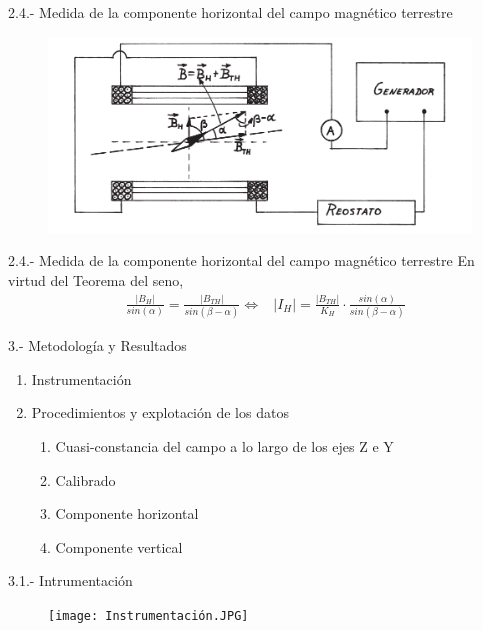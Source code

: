 \documentclass{beamer}
\newcommand{\ifff}{\Leftrightarrow}
\providecommand{\abs}[1]{\left|#1\right|}
\begin{document}
\begin{frame}{2.4.- Medida de la componente horizontal del campo magnético terrestre}
    \begin{figure}
        \centering
        \includegraphics[scale=0.35]{imagen_2023-04-17_035041851.png}
        \label{fig:my_label}
    \end{figure}
\cite{Boix}
\end{frame}
\begin{frame}{2.4.- Medida de la componente horizontal del campo magnético terrestre}
En virtud del Teorema del seno, \pause
    \begin{align*}
        & \frac{\abs{B_{H}}}{sin(\alpha)} = \frac{\abs{B_{TH}}}{sin(\beta-\alpha)} \nonumber \ifff
        & \abs{I_{H}} = \frac{\abs{B_{TH}}}{K_{H}} \cdot \frac{sin(\alpha)}{sin(\beta - \alpha)}
    \end{align*}
\end{frame}
\begin{frame}{3.- Metodología y Resultados}
\begin{enumerate}
\item Instrumentación
\item Procedimientos y explotación de los datos
\begin{enumerate}[label*=\arabic*.]
    \item Cuasi-constancia del campo a lo largo de los ejes Z e Y
    \item Calibrado
    \item Componente horizontal
    \item Componente vertical
    \end{enumerate}
\end{enumerate}
\end{frame}
\begin{frame}{3.1.- Intrumentación}
 \begin{figure}
  \texttt{[image: Instrumentación.JPG]}
  \end{figure}
\cite{UGR}
\end{frame}
\end{document}
